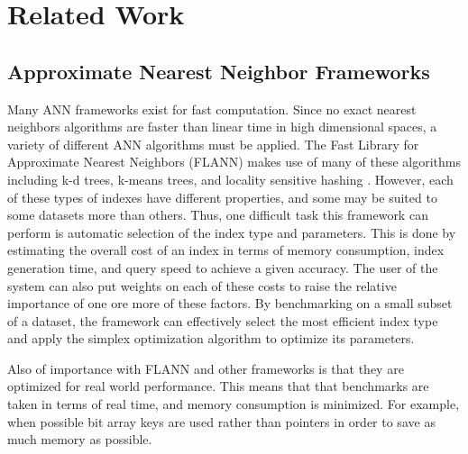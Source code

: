 \chapter{Related Work} %

\label{Related Work} %


\section{Approximate Nearest Neighbor Frameworks}

Many ANN frameworks exist for fast computation.  Since no exact nearest neighbors algorithms are faster than linear time in high dimensional spaces, a variety of different ANN algorithms must be applied.  The Fast Library for Approximate Nearest Neighbors (FLANN) makes use of many of these algorithms including k-d trees, k-means trees, and locality sensitive hashing \citep{muja_flann_2009}.  However, each of these types of indexes have different properties, and some may be suited to some datasets more than others.  Thus, one difficult task this framework can perform is automatic selection of the index type and parameters.  This is done by estimating the overall cost of an index in terms of memory consumption, index generation time, and query speed to achieve a given accuracy.  The user of the system can also put weights on each of these costs to raise the relative importance of one ore more of these factors.  By benchmarking on a small subset of a dataset, the framework can effectively select the most efficient index type and apply the simplex optimization algorithm \citep{nelder1965simplex} to optimize its parameters.

Also of importance with FLANN and other frameworks is that they are optimized for real world performance.  This means that that benchmarks are taken in terms of real time, and memory consumption is minimized.  For example, when possible bit array keys are used rather than pointers in order to save as much memory as possible.